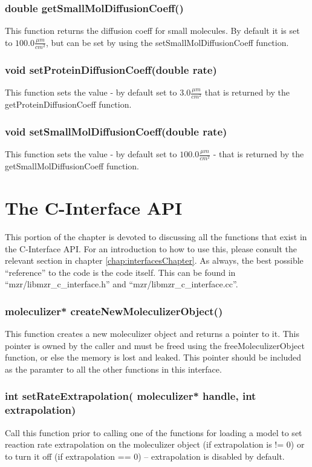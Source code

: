 \subsubsection{double getSmallMolDiffusionCoeff()}
This function returns the diffusion coeff for small molecules.  By default it
is set to $100.0\frac{\mu m}{cm^2}$, but can be set by using the
setSmallMolDiffusionCoeff function.

\subsubsection{void setProteinDiffusionCoeff(double rate)}
This function sets the value - by default set to $3.0\frac{\mu
  m}{cm^2}$ that is returned by the getProteinDiffusionCoeff function.

\subsubsection{void setSmallMolDiffusionCoeff(double rate)}

This function sets the value - by default set to $100.0\frac{\mu
  m}{cm^2}$ - that is returned by the getSmallMolDiffusionCoeff function.

\section{The C-Interface API}
This portion of the chapter is devoted to discussing all the functions
that exist in the C-Interface API.  For an introduction to how to use
this, please consult the relevant section in chapter
\ref{chap:interfacesChapter}.  As always, the best possible
``reference'' to the code is the code itself.  This can be found in
``mzr/libmzr\_c\_interface.h'' and ``mzr/libmzr\_c\_interface.cc''.

\subsubsection{moleculizer* createNewMoleculizerObject()}
This function creates a new moleculizer object and returns a pointer
to it.  This pointer is owned by the caller and must be freed using
the freeMoleculizerObject function, or else the memory is lost and
leaked.  This pointer should be included as the paramter to all the
other functions in this interface.    

\subsubsection{int setRateExtrapolation( moleculizer* handle, int
  extrapolation)}
Call this function prior to calling one of the functions for loading a
model to set reaction rate extrapolation on the moleculizer object (if
extrapolation is != 0) or to turn it off (if extrapolation == 0) --
extrapolation is disabled by default.

